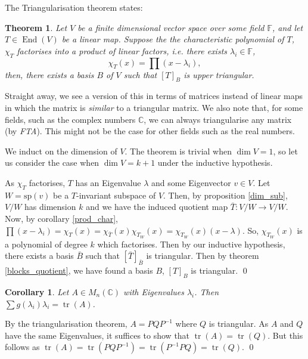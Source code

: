\documentclass[
]{article}
\newtheorem{theorem}{Theorem}
\newtheorem{corollary}{Corollary}[theorem]
\theoremstyle{definition}
\begin{document}
The Triangularisation theorem states:

\begin{theorem}
  Let \(V\) be a finite dimensional vector space over some field \(\mathbb{F}\), 
  and let \(T \in \mathop{\mathrm{End}}(V)\) be a linear map. Suppose the the characteristic 
  polynomial of \(T\), \(\chi_T\) factorises into a product of linear factors, 
  i.e. there exists \(\lambda_i \in \mathbb{F}\), 
  \[\chi_T(x) = \prod (x - \lambda_i),\]
  then, there exists a basis \(B\) of \(V\) such that \([T]_B\) is upper 
  triangular.
\end{theorem}

Straight away, we see a version of this in terms of matrices instead of
linear maps in which the matrix is \emph{similar} to a triangular
matrix. We also note that, for some fields, such as the complex numbers
\(\mathbb{C}\), we can always triangularise any matrix (by \emph{FTA}).
This might not be the case for other fields such as the real numbers.

\proof

We induct on the dimension of \(V\). The theorem is trivial when
\(\dim V = 1\), so let us consider the case when \(\dim V = k + 1\)
under the inductive hypothesis.

As \(\chi_T\) factorises, \(T\) has an Eigenvalue \(\lambda\) and some
Eigenvector \(v \in V\). Let \(W = \text{sp}(v)\) be a \(T\)-invariant
subspace of \(V\). Then, by proposition \ref{dim_sub}, \(V / W\) has
dimension \(k\) and we have the induced quotient map
\(\bar{T} : V / W \to V / W\). Now, by corollary \ref{prod_char},
\(\prod (x - \lambda_i) = \chi_T(x) =  \chi_{\bar{T}}(x) \chi_{T_W}(x) = \chi_{T_W}(x)(x - \lambda)\).
So, \(\chi_{T_W}(x)\) is a polynomial of degree \(k\) which factorises.
Then by our inductive hypothesis, there exists a basis \(\bar{B}\) such
that \([\bar{T}]_{\bar{B}}\) is triangular. Then by theorem
\ref{blocks_quotient}, we have found a basis \(B\), \([T]_B\) is
triangular. \qed

\begin{corollary}
  Let \(A \in M_n(\mathbb{C})\) with Eigenvalues \(\lambda_i\). Then 
  \(\sum g(\lambda_i)\lambda_i = \mathop{\mathrm{tr}}(A)\).
\end{corollary}
\proof

By the triangularisation theorem, \(A = PQP^{-1}\) where \(Q\) is
triangular. As \(A\) and \(Q\) have the same Eigenvalues, it suffices to
show that \(\mathop{\mathrm{tr}}(A) = \mathop{\mathrm{tr}}(Q)\). But
this follows as
\(\mathop{\mathrm{tr}}(A) = \mathop{\mathrm{tr}}(PQP^{-1}) =  \mathop{\mathrm{tr}}(P^{-1}PQ) = \mathop{\mathrm{tr}}(Q)\).
\qed
\end{document}
